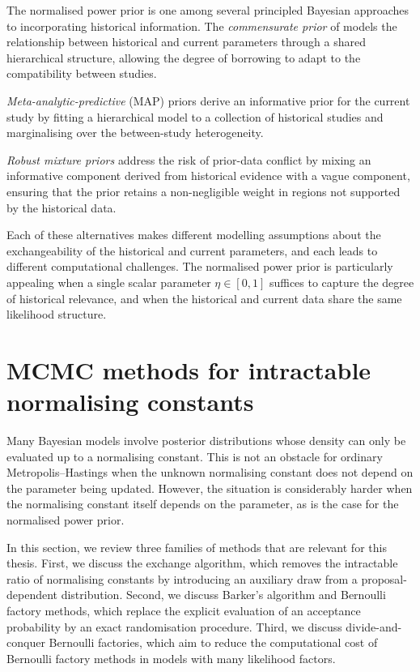 The normalised power prior is one among several principled Bayesian approaches to incorporating historical information.
The \textit{commensurate prior} of  models the relationship between historical and current parameters through a shared hierarchical structure, allowing the degree of borrowing to adapt to the compatibility between studies.

\textit{Meta-analytic-predictive} (MAP) priors \cite{neuenschwander2010} derive an informative prior for the current study by fitting a hierarchical model to a collection of historical studies and marginalising over the between-study heterogeneity.

\textit{Robust mixture priors} \cite{schmidli2014} address the risk of prior-data conflict by mixing an informative component derived from historical evidence with a vague component, ensuring that the prior retains a non-negligible weight in regions not supported by the historical data.

Each of these alternatives makes different modelling assumptions about the exchangeability of the historical and current parameters, and each leads to different computational challenges.
The normalised power prior is particularly appealing when a single scalar parameter $\eta \in [0,1]$ suffices to capture the degree of historical relevance, and when the historical and current data share the same likelihood structure.

\section{MCMC methods for intractable normalising constants}
\label{sec:mcmc-intractable}

Many Bayesian models involve posterior distributions whose density can only be evaluated up to a normalising constant.
This is not an obstacle for ordinary Metropolis--Hastings when the unknown normalising constant does not depend on the parameter being updated.
However, the situation is considerably harder when the normalising constant itself depends on the parameter, as is the case for the normalised power prior.

In this section, we review three families of methods that are relevant for this thesis.
First, we discuss the exchange algorithm, which removes the intractable ratio of normalising constants by introducing an auxiliary draw from a proposal-dependent distribution.
Second, we discuss Barker's algorithm and Bernoulli factory methods, which replace the explicit evaluation of an acceptance probability by an exact randomisation procedure.
Third, we discuss divide-and-conquer Bernoulli factories, which aim to reduce the computational cost of Bernoulli factory methods in models with many likelihood factors.

